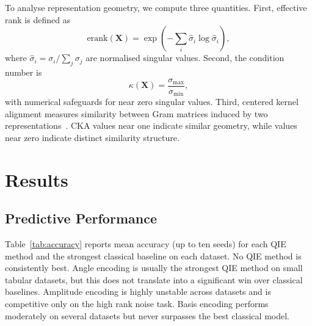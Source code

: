 \documentclass[12pt]{article}
\newcommand{\erank}{\mathrm{erank}}
\begin{document}
To analyse representation geometry, we compute three quantities. First,
effective rank is defined as
\begin{equation}
\erank(\mathbf{X}) =
\exp\left(-\sum_i \hat{\sigma}_i \log \hat{\sigma}_i\right),
\label{eq:erank}
\end{equation}
where $\hat{\sigma}_i = \sigma_i / \sum_j \sigma_j$ are normalised singular
values. Second, the condition number is
\begin{equation}
\kappa(\mathbf{X}) = \frac{\sigma_{\max}}{\sigma_{\min}},
\end{equation}
with numerical safeguards for near zero singular values. Third, centered kernel
alignment measures similarity between Gram matrices induced by two
representations~\citep{kornblith2019}. CKA values near one indicate similar
geometry, while values near zero indicate distinct similarity structure.

\clearpage

\section{Results}
\label{sec:results}

\subsection{Predictive Performance}
\label{sec:perf}

Table~\ref{tab:accuracy} reports mean accuracy (up to ten seeds) for each QIE
method and the strongest classical baseline on each dataset. No QIE method is
consistently best. Angle encoding is usually the strongest QIE method on small
tabular datasets, but this does not translate into a significant win over
classical baselines. Amplitude encoding is highly unstable across datasets and
is competitive only on the high rank noise task. Basis encoding performs
moderately on several datasets but never surpasses the best classical model.
\end{document}
